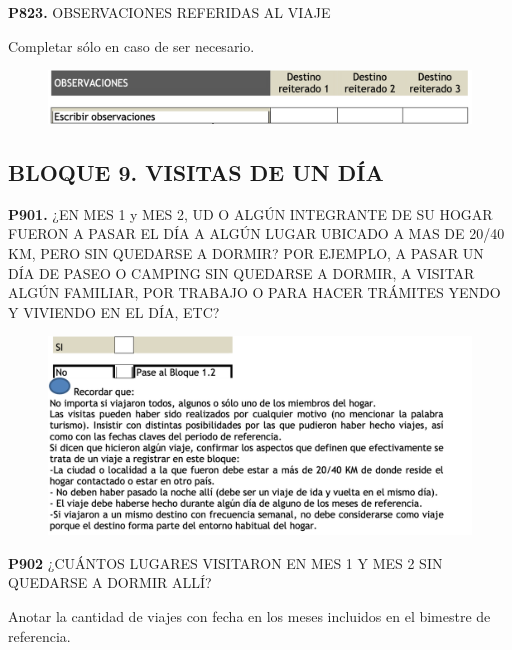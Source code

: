 \documentclass[
  openany]{book}
\begin{document}
\textbf{P823.} OBSERVACIONES REFERIDAS AL VIAJE

Completar sólo en caso de ser necesario.

\begin{figure}

{\centering \includegraphics[width=1\linewidth]{imagenes/figura6-281} 

}

\end{figure}

\hypertarget{bloque-9.-visitas-de-un-duxeda}{%
\subsection{\texorpdfstring{\textbf{BLOQUE 9. VISITAS DE UN DÍA}}{BLOQUE 9. VISITAS DE UN DÍA}}\label{bloque-9.-visitas-de-un-duxeda}}

\textbf{P901.} ¿EN MES 1 y MES 2, UD O ALGÚN INTEGRANTE DE SU HOGAR FUERON A PASAR EL DÍA A ALGÚN LUGAR UBICADO A MAS DE 20/40 KM, PERO SIN QUEDARSE A DORMIR? POR EJEMPLO, A PASAR UN DÍA DE PASEO O CAMPING SIN QUEDARSE A DORMIR, A VISITAR ALGÚN FAMILIAR, POR TRABAJO O PARA HACER TRÁMITES YENDO Y VIVIENDO EN EL DÍA, ETC?

\begin{figure}

{\centering \includegraphics[width=1\linewidth]{imagenes/figura6-282} 

}

\end{figure}

\textbf{P902} ¿CUÁNTOS LUGARES VISITARON EN MES 1 Y MES 2 SIN QUEDARSE A DORMIR ALLÍ?

Anotar la cantidad de viajes con fecha en los meses incluidos en el bimestre de referencia.
\end{document}

